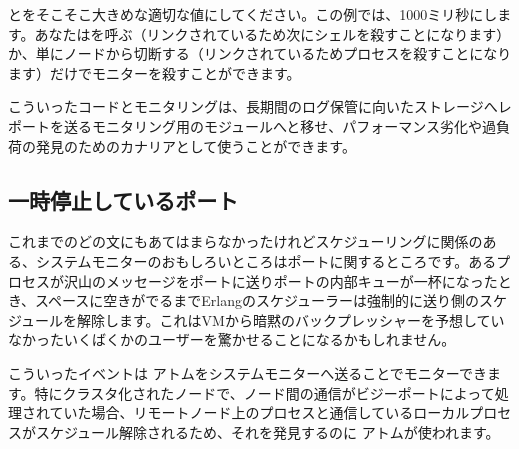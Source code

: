とをそこそこ大きめな適切な値にしてください。この例では、1000ミリ秒にします。あなたはを呼ぶ（リンクされているため次にシェルを殺すことになります）か、単にノードから切断する（リンクされているためプロセスを殺すことになります）だけでモニターを殺すことができます。

こういったコードとモニタリングは、長期間のログ保管に向いたストレージへレポートを送るモニタリング用のモジュールへと移せ、パフォーマンス劣化や過負荷の発見のためのカナリアとして使うことができます。

\subsection{一時停止しているポート}
\label{subsec:port-system-monitors}

これまでのどの文にもあてはまらなかったけれどスケジューリングに関係のある、システムモニターのおもしろいところはポートに関するところです。あるプロセスが沢山のメッセージをポートに送りポートの内部キューが一杯になったとき、スペースに空きがでるまでErlangのスケジューラーは強制的に送り側のスケジュールを解除します。これはVMから暗黙のバックプレッシャーを予想していなかったいくばくかのユーザーを驚かせることになるかもしれません。

こういったイベントは  アトムをシステムモニターへ送ることでモニターできます。特にクラスタ化されたノードで、ノード間の通信がビジーポートによって処理されていた場合、リモートノード上のプロセスと通信しているローカルプロセスがスケジュール解除されるため、それを発見するのに  アトムが使われます。

